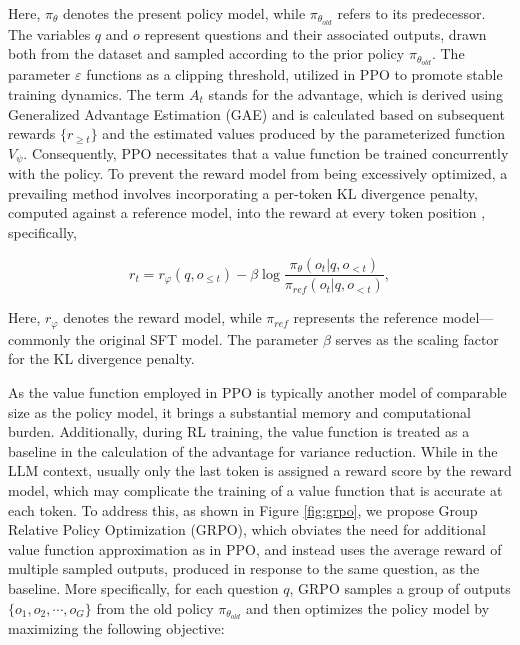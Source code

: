 \begin{itemize}[topsep=0pt]
\begin{itemize}[topsep=0pt]
Here, $\pi_{\theta}$ denotes the present policy model, while $\pi_{\theta_{old}}$ refers to its predecessor. The variables $q$ and $o$ represent questions and their associated outputs, drawn both from the dataset and sampled according to the prior policy $\pi_{\theta_{old}}$. The parameter $\varepsilon$ functions as a clipping threshold, utilized in PPO to promote stable training dynamics. The term $A_t$ stands for the advantage, which is derived using Generalized Advantage Estimation (GAE) \citep{gae} and is calculated based on subsequent rewards $\{r_{\ge t}\}$ and the estimated values produced by the parameterized function $V_{\psi}$. Consequently, PPO necessitates that a value function be trained concurrently with the policy. To prevent the reward model from being excessively optimized, a prevailing method involves incorporating a per-token KL divergence penalty, computed against a reference model, into the reward at every token position \citep{ouyang2022training}, specifically,

\begin{equation}
    r_{t} = r_\varphi(q, o_{\le t}) - \beta \log\frac{\pi_{\theta}(o_{t}|q, o_{<t})}{\pi_{ref}(o_{t}|q, o_{<t})},
\label{eq:PPO-reward}
\end{equation}

Here, $r_\varphi$ denotes the reward model, while $\pi_{ref}$ represents the reference model—commonly the original SFT model. The parameter $\beta$ serves as the scaling factor for the KL divergence penalty.

As the value function employed in PPO is typically another model of comparable size as the policy model, it brings a substantial memory and computational burden. Additionally, during RL training, the value function is treated as a baseline in the calculation of the advantage for variance reduction. While in the LLM context, usually only the last token is assigned a reward score by the reward model, which may complicate the training of a value function that is accurate at each token. To address this, as shown in Figure \ref{fig:grpo}, we propose Group Relative Policy Optimization (GRPO), which obviates the need for additional value function approximation as in PPO, and instead uses the average reward of multiple sampled outputs, produced in response to the same question, as the baseline. More specifically, for each question $q$, GRPO samples a group of outputs $\{o_1, o_2, \cdots, o_G\}$  from the old policy  $\pi_{\theta_{old}}$  and then optimizes the policy model by maximizing the following objective:


\end{itemize}
\end{itemize}
